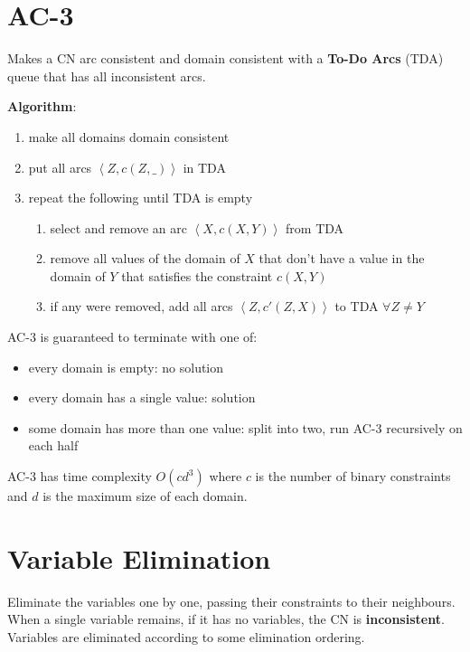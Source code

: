 \documentclass[11pt]{article}
\begin{document}
\section{AC-3}
\label{sec:orgcd028cc}
Makes a CN arc consistent and domain consistent with a \textbf{To-Do Arcs} (TDA) queue that has all inconsistent arcs.

\textbf{Algorithm}:
\begin{enumerate}
\item make all domains domain consistent
\item put all arcs \(\left< Z, c(Z, \_) \right>\) in TDA
\item repeat the following until TDA is empty
\begin{enumerate}
\item select and remove an arc \(\left< X, c(X, Y) \right>\) from TDA
\item remove all values of the domain of \(X\) that don't have a value in the domain of \(Y\) that satisfies
the constraint \(c(X, Y)\)
\item if any were removed, add all arcs \(\left< Z, c'(Z, X) \right>\) to TDA \(\forall Z \ne Y\)
\end{enumerate}
\end{enumerate}

AC-3 is guaranteed to terminate with one of:
\begin{itemize}
\item every domain is empty: no solution
\item every domain has a single value: solution
\item some domain has more than one value: split into two, run AC-3 recursively on each half
\end{itemize}

AC-3 has time complexity \(O(cd^{3})\) where \(c\) is the number of binary constraints and \(d\) is the maximum
size of each domain.
\section{Variable Elimination}
\label{sec:org5e706fd}
Eliminate the variables one by one, passing their constraints to their neighbours.
When a single variable remains, if it has no variables, the CN is \textbf{inconsistent}.
Variables are eliminated according to some elimination ordering.
\end{document}
